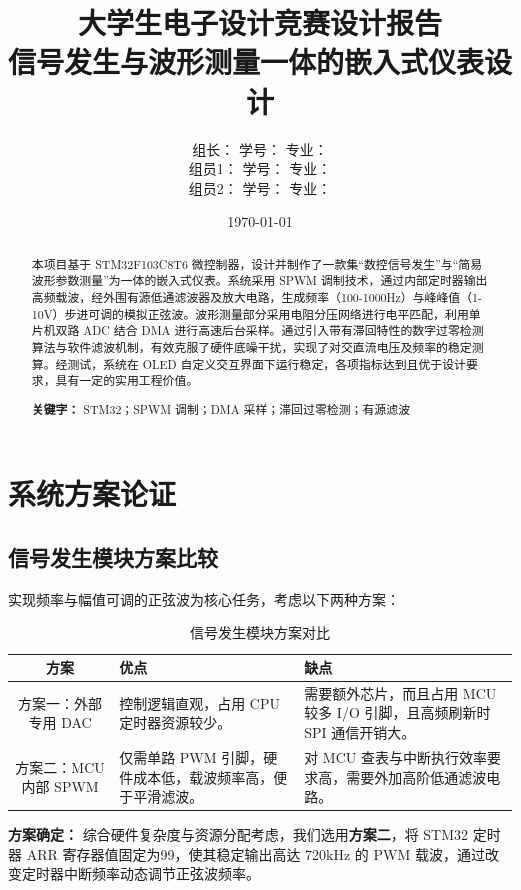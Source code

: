 \documentclass[a4paper,12pt]{ctexart}
\title{\vspace{2cm}\textbf{\Huge 大学生电子设计竞赛设计报告}\\\vspace{1cm}\Large 信号发生与波形测量一体的嵌入式仪表设计}
\author{
     组长：\underline{\makebox[3cm][c]{吕佳霖}} \quad 学号：\underline{\makebox[3cm][c]{2411335}} \quad 专业：\underline{\makebox[4cm][c]{电子信息科学与技术}}\\[1ex]
     组员1：\underline{\makebox[3cm][c]{朱彦霖}} \quad 学号：\underline{\makebox[3cm][c]{2411571}} \quad 专业：\underline{\makebox[4cm][c]{电子科学与技术}} \\[1ex]
     组员2：\underline{\makebox[3cm][c]{徐俊喆}} \quad 学号：\underline{\makebox[3cm][c]{2411954}} \quad 专业：\underline{\makebox[4cm][c]{电子信息科学与技术}}\\[1ex]
}
\date{\vspace{4cm}\today}
\begin{document}
\maketitle
\thispagestyle{empty} %
\newpage
\setcounter{page}{1}

\begin{abstract}
本项目基于 STM32F103C8T6 微控制器，设计并制作了一款集“数控信号发生”与“简易波形参数测量”为一体的嵌入式仪表。系统采用 SPWM 调制技术，通过内部定时器输出高频载波，经外围有源低通滤波器及放大电路，生成频率（100-1000Hz）与峰峰值（1-10V）步进可调的模拟正弦波。波形测量部分采用电阻分压网络进行电平匹配，利用单片机双路 ADC 结合 DMA 进行高速后台采样。通过引入带有滞回特性的数字过零检测算法与软件滤波机制，有效克服了硬件底噪干扰，实现了对交直流电压及频率的稳定测算。经测试，系统在 OLED 自定义交互界面下运行稳定，各项指标达到且优于设计要求，具有一定的实用工程价值。

\textbf{关键字：} STM32；SPWM 调制；DMA 采样；滞回过零检测；有源滤波
\end{abstract}

\section{系统方案论证}

\subsection{信号发生模块方案比较}
实现频率与幅值可调的正弦波为核心任务，考虑以下两种方案：

\begin{table}[H]
    \centering
    \caption{信号发生模块方案对比}
    \begin{tabular}{cp{6cm}p{4cm}}
        \toprule
        \textbf{方案} & \textbf{优点} & \textbf{缺点} \\
        \midrule
        方案一：外部专用 DAC & 控制逻辑直观，占用 CPU 定时器资源较少。 & 需要额外芯片，而且占用 MCU 较多 I/O 引脚，且高频刷新时 SPI 通信开销大。 \\
        方案二：MCU 内部 SPWM & 仅需单路 PWM 引脚，硬件成本低，载波频率高，便于平滑滤波。 & 对 MCU 查表与中断执行效率要求高，需要外加高阶低通滤波电路。 \\
        \bottomrule
    \end{tabular}
\end{table}
\textbf{方案确定：} 综合硬件复杂度与资源分配考虑，我们选用\textbf{方案二}，将 STM32 定时器 ARR 寄存器值固定为99，使其稳定输出高达 720kHz 的 PWM 载波，通过改变定时器中断频率动态调节正弦波频率。
\end{document}
